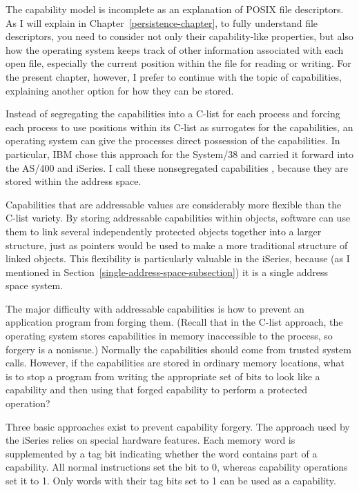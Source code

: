 The capability model is incomplete as an explanation of POSIX file
descriptors.  As I will explain in Chapter~\ref{persistence-chapter},
to fully understand file descriptors, you need to consider not only
their capability-like properties, but also how the operating system
keeps track of other information associated with each open file,
especially the current position within the file for reading or
writing.  For the present chapter, however, I prefer to continue with the topic of
capabilities, explaining another option for how they can be stored.

Instead of segregating the capabilities into a C-list for each
process and forcing each process to use positions within its C-list
as surrogates for the capabilities, an operating system can give the
processes direct possession of the capabilities.  In particular, IBM
chose this approach for the System/38 and carried it
forward into the AS/400 and
iSeries.  I call these nonsegregated capabilities
, because they are stored within the address space.

Capabilities that are addressable values are considerably more
flexible than the C-list variety.  By storing addressable capabilities
within objects, software can use them to link several independently
protected objects together into a larger structure, just as pointers
would be used to make a more traditional structure of linked objects.
This flexibility is particularly valuable in the iSeries, because (as I
mentioned in Section~\ref{single-address-space-subsection}) it is a single address space system.

The major difficulty with addressable capabilities is how to prevent
an application program from forging them.  (Recall that in the C-list
approach, the operating system stores capabilities in memory
inaccessible to the process, so forgery is a nonissue.)  Normally the
capabilities should come from trusted system calls.  However, if the capabilities
are stored in ordinary memory locations, what is to stop a program
from writing the appropriate set of bits to look like a capability and then using that
forged capability to perform a protected operation?

Three basic approaches exist to prevent capability forgery.  The
approach used by the iSeries relies on special hardware
features.  Each memory word is supplemented by a tag bit indicating
whether the word contains part of a capability.  All normal
instructions set the bit to 0, whereas capability operations set it to
1.  Only words with their tag bits set to 1 can be used as a
capability.

